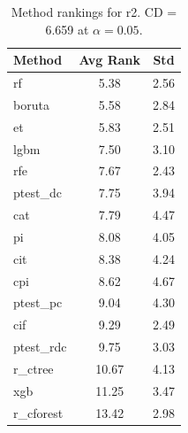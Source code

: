 \begin{table}[h]
\centering
\caption{Method rankings for r2. CD = 6.659 at $\alpha=0.05$.}
\label{tab:ranks_r2}
\begin{tabular}{lcc}
\toprule
Method & Avg Rank & Std \\
\midrule
rf & 5.38 & 2.56 \\
boruta & 5.58 & 2.84 \\
et & 5.83 & 2.51 \\
lgbm & 7.50 & 3.10 \\
rfe & 7.67 & 2.43 \\
ptest_dc & 7.75 & 3.94 \\
cat & 7.79 & 4.47 \\
pi & 8.08 & 4.05 \\
cit & 8.38 & 4.24 \\
cpi & 8.62 & 4.67 \\
ptest_pc & 9.04 & 4.30 \\
cif & 9.29 & 2.49 \\
ptest_rdc & 9.75 & 3.03 \\
r_ctree & 10.67 & 4.13 \\
xgb & 11.25 & 3.47 \\
r_cforest & 13.42 & 2.98 \\
\bottomrule
\end{tabular}
\end{table}